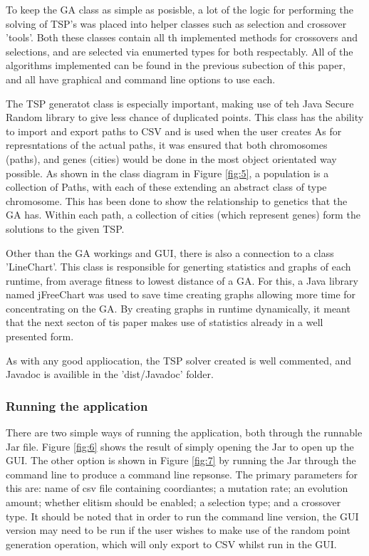 \documentclass[article]{IEEEtran}
\begin{document}
To keep the GA class as simple as posisble, a lot of the logic for performing the solving of TSP's was placed into helper classes such as selection and crossover 'tools'. Both these classes contain all th implemented methods for crossovers and selections, and are selected via enumerted types for both respectably. All of the algorithms implemented can be found in the previous subection of this paper, and all have graphical and command line options to use each. \par
The TSP generatot class is especially important, making use of teh Java Secure Random library to give less chance of duplicated points. This class has the ability to import and export paths to CSV and is used when the user creates 
As for represntations of the actual paths, it was ensured that both chromosomes (paths), and genes (cities) would be done in the most object orientated way possible. As shown in the class diagram in Figure \ref{fig:5}, a population is a collection of Paths, with each of these extending an abstract class of type chromosome. This has been done to show the relationship to genetics that the GA has. Within each path, a collection of cities (which represent genes) form the solutions to the given TSP. \par
Other than the GA workings and GUI, there is also a connection to a class 'LineChart'. This class is responsible for generting statistics and graphs of each runtime, from average fitness to lowest distance of a GA. For this, a Java library named jFreeChart \cite{10} was used to save time creating graphs allowing more time for concentrating on the GA. By creating graphs in runtime dynamically, it meant that the next secton of tis paper makes use of statistics already in a well presented form.\par
As with any good appliocation, the TSP solver created is well commented, and Javadoc is availible in the 'dist/Javadoc' folder.

\subsubsection{Running the application}
There are two simple ways of running the application, both through the runnable Jar file. Figure \ref{fig:6} shows the result of simply opening the Jar to open up the GUI. The other option is shown in Figure \ref{fig:7} by running the Jar through the command line to produce a command line repsonse. The primary parameters for this are: name of csv file containing coordiantes; a mutation rate; an evolution amount; whether elitism should be enabled; a selection type; and a crossover type. It should be noted that in order to run the command line version, the GUI version may need to be run if the user wishes to make use of the random point generation operation, which will only export to CSV whilst run in the GUI.
\end{document}

